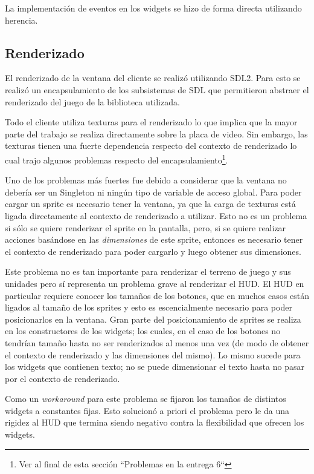 \documentclass[titlepage,a4paper,12pt]{article}
\begin{document}
La implementación de eventos en los widgets se hizo de forma directa utilizando herencia.

\subsection{Renderizado}
El renderizado de la ventana del cliente se realizó utilizando SDL2. Para esto se realizó un encapsulamiento de los subsistemas de SDL que permitieron abstraer el renderizado del juego de la biblioteca utilizada.

Todo el cliente utiliza texturas para el renderizado lo que implica que la mayor parte del trabajo se realiza directamente sobre la placa de video. Sin embargo, las texturas tienen una fuerte dependencia respecto del contexto de renderizado lo cual trajo algunos problemas respecto del encapsulamiento\footnote{Ver al final de esta sección ``Problemas en la entrega 6``}. 

Uno de los problemas más fuertes fue debido a considerar que la ventana no debería ser un Singleton ni ningún tipo de variable de acceso global. Para poder cargar un sprite es necesario tener la ventana, ya que la carga de texturas está ligada directamente al contexto de renderizado a utilizar. Esto no es un problema si sólo se quiere renderizar el sprite en la pantalla, pero, si se quiere realizar acciones basándose en las \textit{dimensiones} de este sprite, entonces es necesario tener el contexto de renderizado para poder cargarlo y luego obtener sus dimensiones.

Este problema no es tan importante para renderizar el terreno de juego y sus unidades pero sí representa un problema grave al renderizar el HUD. El HUD en particular requiere conocer los tamaños de los botones, que en muchos casos están ligados al tamaño de los sprites y esto es escencialmente necesario para poder posicionarlos en la ventana. Gran parte del posicionamiento de sprites se realiza en los constructores de los widgets; los cuales, en el caso de los botones no tendrían tamaño hasta no ser renderizados al menos una vez (de modo de obtener el contexto de renderizado y las dimensiones del mismo). Lo mismo sucede para los widgets que contienen texto; no se puede dimensionar el texto hasta no pasar por el contexto de renderizado.

Como un \textit{workaround} para este problema se fijaron los tamaños de distintos widgets a constantes fijas. Esto solucionó a priori el problema pero le da una rigidez al HUD que termina siendo negativo contra la flexibilidad que ofrecen los widgets.
\end{document}
